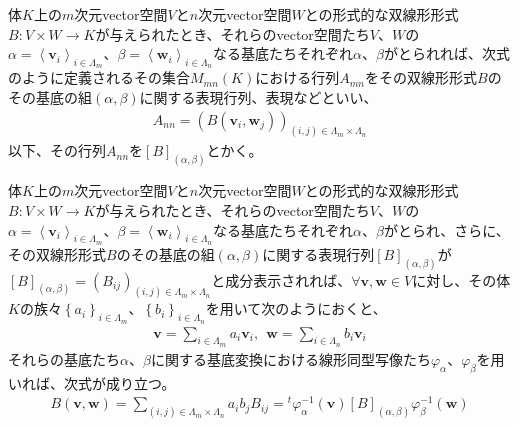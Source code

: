 \documentclass[dvipdfmx]{jsarticle}
\begin{document}
\begin{dfn}
体$K$上の$m$次元vector空間$V$と$n$次元vector空間$W$との形式的な双線形形式$B:V \times W \rightarrow K$が与えられたとき、それらのvector空間たち$V$、$W$の$\alpha = \left\langle \mathbf{v}_{i} \right\rangle_{i \in \varLambda_{m}}$、$\beta = \left\langle \mathbf{w}_{i} \right\rangle_{i \in \varLambda_{n}}$なる基底たちそれぞれ$\alpha$、$\beta$がとられれば、次式のように定義されるその集合$M_{mn}(K)$における行列$A_{mn}$をその双線形形式$B$のその基底の組$(\alpha,\beta)$に関する表現行列、表現などといい、
\begin{align*}
A_{nn} = \left( B\left( \mathbf{v}_{i},\mathbf{w}_{j} \right) \right)_{(i,j) \in \varLambda_{m} \times \varLambda_{n}}
\end{align*}
以下、その行列$A_{nn}$を$[ B]_{(\alpha,\beta)}$とかく。
\end{dfn}
\begin{thm}\label{2.4.3.3}
体$K$上の$m$次元vector空間$V$と$n$次元vector空間$W$との形式的な双線形形式$B:V \times W \rightarrow K$が与えられたとき、それらのvector空間たち$V$、$W$の$\alpha = \left\langle \mathbf{v}_{i} \right\rangle_{i \in \varLambda_{m}}$、$\beta = \left\langle \mathbf{w}_{i} \right\rangle_{i \in \varLambda_{n}}$なる基底たちそれぞれ$\alpha$、$\beta$がとられ、さらに、その双線形形式$B$のその基底の組$(\alpha,\beta)$に関する表現行列$[ B]_{(\alpha,\beta)}$が$[ B]_{(\alpha,\beta)} = \left( B_{ij} \right)_{(i,j) \in \varLambda_{m} \times \varLambda_{n}}$と成分表示されれば、$\forall\mathbf{v},\mathbf{w} \in V$に対し、その体$K$の族々$\left\{ a_{i} \right\}_{i \in \varLambda_{m}}$、$\left\{ b_{i} \right\}_{i \in \varLambda_{n}}$を用いて次のようにおくと、
\begin{align*}
\mathbf{v} = \sum_{i \in \varLambda_{m}} {a_{i}\mathbf{v}_{i}},\ \ \mathbf{w} = \sum_{i \in \varLambda_{n}} {b_{i}\mathbf{v}_{i}}
\end{align*}
それらの基底たち$\alpha$、$\beta$に関する基底変換における線形同型写像たち$\varphi_{\alpha}$、$\varphi_{\beta}$を用いれば、次式が成り立つ。
\begin{align*}
B\left( \mathbf{v},\mathbf{w} \right) = \sum_{(i,j) \in \varLambda_{m} \times \varLambda_{n}} {a_{i}b_{j}B_{ij}} ={}^{t}\varphi_{\alpha}^{- 1}\left( \mathbf{v} \right)[ B]_{(\alpha,\beta)}\varphi_{\beta}^{- 1}\left( \mathbf{w} \right)
\end{align*}
\end{thm}
\end{document}
